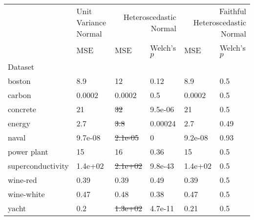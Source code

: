 \begin{tabular}{l|l|ll|ll}
\toprule
 & Unit Variance Normal & \multicolumn{2}{r}{Heteroscedastic Normal} & \multicolumn{2}{r}{Faithful Heteroscedastic Normal} \\
 & MSE & MSE & Welch's $p$ & MSE & Welch's $p$ \\
Dataset &  &  &  &  &  \\
\midrule
boston & 8.9 & 12 & 0.12 & 8.9 & 0.5 \\
carbon & 0.0002 & 0.0002 & 0.5 & 0.0002 & 0.5 \\
concrete & 21 & \sout{32} & 9.5e-06 & 21 & 0.5 \\
energy & 2.7 & \sout{3.8} & 0.00024 & 2.7 & 0.49 \\
naval & 9.7e-08 & \sout{2.1e-05} & 0 & 9.2e-08 & 0.93 \\
power plant & 15 & 16 & 0.36 & 15 & 0.5 \\
superconductivity & 1.4e+02 & \sout{2.1e+02} & 9.8e-43 & 1.4e+02 & 0.5 \\
wine-red & 0.39 & 0.39 & 0.49 & 0.39 & 0.5 \\
wine-white & 0.47 & 0.48 & 0.38 & 0.47 & 0.5 \\
yacht & 0.2 & \sout{1.3e+02} & 4.7e-11 & 0.21 & 0.5 \\
\bottomrule
\end{tabular}

